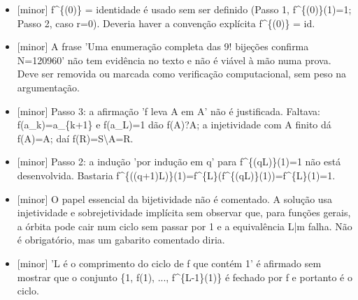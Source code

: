 \documentclass{article}%
\begin{document}
\begin{itemize}%
\item%
{[}minor{]} f\^{}\{(0)\} = identidade é usado sem ser definido (Passo 1, f\^{}\{(0)\}(1)=1; Passo 2, caso r=0). Deveria haver a convenção explícita f\^{}\{(0)\} = id.%
\item%
{[}minor{]} A frase 'Uma enumeração completa das 9! bijeções confirma N=120960' não tem evidência no texto e não é viável à mão numa prova. Deve ser removida ou marcada como verificação computacional, sem peso na argumentação.%
\item%
{[}minor{]} Passo 3: a afirmação 'f leva A em A' não é justificada. Faltava: f(a\_k)=a\_\{k+1\} e f(a\_L)=1 dão f(A)?A; a injetividade com A finito dá f(A)=A; daí f(R)=S\textbackslash{}A=R.%
\item%
{[}minor{]} Passo 2: a indução 'por indução em q' para f\^{}\{(qL)\}(1)=1 não está desenvolvida. Bastaria f\^{}\{((q+1)L)\}(1)=f\^{}\{L\}(f\^{}\{(qL)\}(1))=f\^{}\{L\}(1)=1.%
\item%
{[}minor{]} O papel essencial da bijetividade não é comentado. A solução usa injetividade e sobrejetividade implícita sem observar que, para funções gerais, a órbita pode cair num ciclo sem passar por 1 e a equivalência L|m falha. Não é obrigatório, mas um gabarito comentado diria.%
\item%
{[}minor{]} 'L é o comprimento do ciclo de f que contém 1' é afirmado sem mostrar que o conjunto \{1, f(1), ..., f\^{}\{L{-}1\}(1)\} é fechado por f e portanto é o ciclo.%
\end{itemize}%
\end{document}
